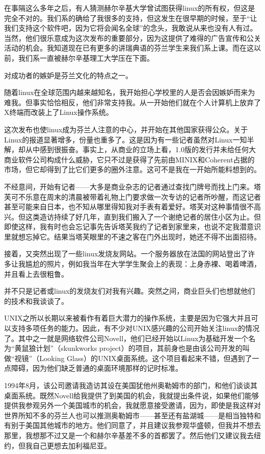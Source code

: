 在事隔这么多年之后，有人猜测赫尔辛基大学曾试图获得linux的所有权，但这是完全不对的。我们系的确给了我很多的支持，但这发生在很早期的时候，至于“让我们支持这个软件吧，因为它将会闻名全球”的念头，我敢说从来也没有人有过。当然，他们很乐意成为这次发布的重要部分，因为这提供了难得的广告宣传和公关活动的机会。我知道现在已有更多的讲瑞典语的芬兰学生来我们系上课。而在这以前，我们系一直被赫尔辛基理工大学压在下面。

对成功者的嫉妒是芬兰文化的特点之一。

随着linux在全球范围内越来越知名，我开始担心学校里的人是否会因嫉妒而来为难我。但事实恰恰相反，他们非常支持我。从一开始他们就在个人计算机上放弃了X终端而改装上了Linux操作系统。

这次发布也使linux成为芬兰人注意的中心，并开始在其他国家获得公众。关于Linux的报道显著增多，份量也重多了。这是因为有一些记者虽然对Linux一知半解，却从中感到很振奋。事实上，从商业的立场上看，1.0版的发行并未给任何大商业软件公司构成什么威胁，它只不过是获得了先前由MINIX和Coherent占据的市场，但它却得到了比它们更多的圈外注意。这可不是我在一开始所能料想到的。

不经意间，开始有记者——大多是商业杂志的记者通过查找门牌号而找上门来。塔芙可不乐意在周末的清晨被带着礼物上门要求做一次专访的记者所吵醒，而这记者甚至可能来自日本，也不知从哪里得知我对手表有着爱好。塔芙对这种事情很不高兴。但这类造访持续了好几年，直到我们搬入了一个谢绝记者的居住小区为止。但即使这样，我有时也会忘记事先告诉塔芙我约了记者到家里来，也说不定我潜意识里就想忘掉它。结果当塔芙眼里的不速之客在门外出现时，她还不得不出面招待。

接着，又突然出现了一些linux发烧友网站。一个服务器放在法国的网站登出了许多让我尴尬的照片，例如我当年在大学学生聚会上的表现：上身赤裸、喝着啤酒，并且看上去很粗鲁。

并不只是记者或linux的发烧友们对我有兴趣。突然之间，商业巨头们也想就他们的技术和我谈谈了。

UNIX之所以长期以来被看作有着巨大潜力的操作系统，主要是因为它强大并且可以支持多项任务的能力。因此，有不少对UNIX感兴趣的公司开始关注linux的情况了。其中之一就是网络软件公司Novell，他们已经开始以Linux为基础开发一个名为“黄鼠狼计划”（skunkworks project）的项目，其前身也是由该公司开发的叫做“视镜”（Looking Glass）的UNIX桌面系统。这个项目看起来不错，但遇到了一点障碍，因为他们缺乏普通的桌面环境那样的记时标准。

1994年8月，该公司邀请我造访其设在美国犹他州奥勒姆市的部门，和他们谈谈其桌面系统。既然Novell给我提供了到美国的机会，我就提出条件说，如果他们能够提供我参观另外一个美国城市的机会，我就愿意接受邀请，因为，即使是我这样对世界所知不多的芬兰人也可以推测奥勒姆市——甚至还有盐湖城——是相当独特和有别于美国其他城市的地方。他们同意了，并且建议我参观华盛顿，但我并不想去那里，我想那不过又是一个和赫尔辛基差不多的首都罢了。然后他们又建议我去纽约，但我自己更想去加利福尼亚。

